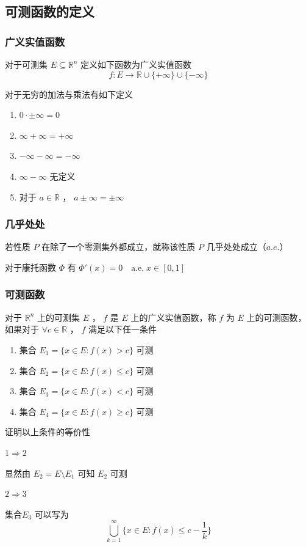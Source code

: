 \documentclass{ctexbook}
\newcommand{\no}{\noindent}
\newcommand{\pro}{\no{\bf 证明：}}
\newcommand{\EXP}{\no {\bf 例}\quad}
\newcommand{\R}{\mathbb{R}}
\newcommand{\nae}{\mathrm{\quad a.e.\; }}
\newcommand{\ITEMS}{\begin{enumerate}[leftmargin=4em]}
\newcommand{\ITEME}{\end{enumerate}}
\begin{document}
\subsection{可测函数的定义}

\subsubsection{广义实值函数}

对于可测集 $E \subseteq \R^n$ 定义如下函数为广义实值函数 
\[
f:E\to\R\cup\{+\infty\}\cup\{-\infty\}
\]

对于无穷的加法与乘法有如下定义
\ITEMS
\item 
$0\cdot\pm \infty= 0$
\item
$\infty + \infty = +\infty$
\item
$-\infty - \infty = -\infty$
\item
$\infty - \infty$ 无定义
\item
对于 $a \in \R$ ， $a\pm\infty = \pm\infty$
\ITEME 

\subsubsection{几乎处处}
若性质 $P$ 在除了一个零测集外都成立，就称该性质 $P$ 几乎处处成立（$a.e.$）

\EXP 对于康托函数 $\Phi$ 有 $\Phi'(x) = 0 \nae x\in[0,1]$

\subsubsection{可测函数}

对于 $\R^n$ 上的可测集 $E$ ， $f$ 是 $E$ 上的广义实值函数，称 $f$ 为 $E$ 上的可测函数，如果对于 $\forall c \in\R$ ， $f$ 满足以下任一条件
\ITEMS
\item 集合 $E_1 = \{x\in E : f(x) > c\}$ 可测
\item 集合 $E_2 = \{x\in E : f(x) \le c\}$ 可测
\item 集合 $E_3 = \{x\in E : f(x) < c\}$ 可测
\item 集合 $E_4 = \{x\in E : f(x) \ge c\}$ 可测
\ITEME 

\pro 证明以上条件的等价性

\no$1\Rightarrow2$

显然由 $E_2 = E\setminus E_1$ 可知 $E_2$ 可测
\smallskip

\no$2\Rightarrow3$

集合$E_3$ 可以写为
\[\bigcup\limits_{k=1} ^\infty \{ x\in E: f(x) \le c-\frac1k\}\]
\end{document}
